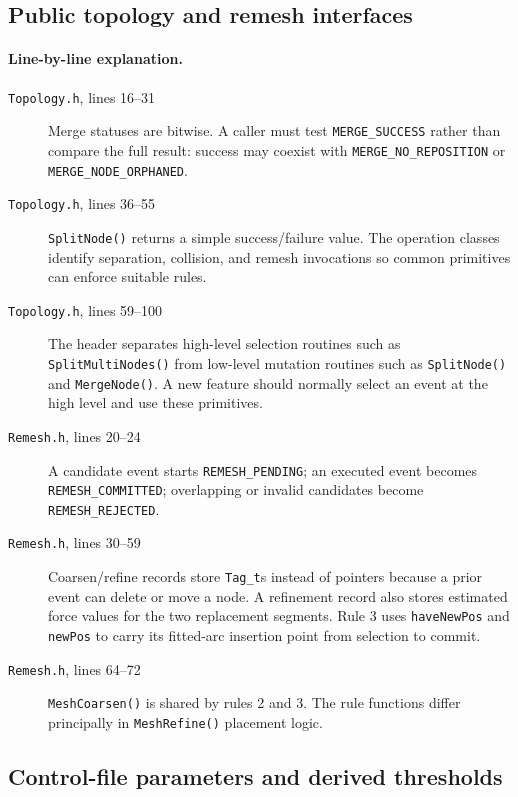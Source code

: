 \documentclass[11pt]{article}
\newcommand{\code}[1]{\texorpdfstring{\nolinkurl{#1}}{#1}}
\newcommand{\srcfile}[1]{\texorpdfstring{\nolinkurl{#1}}{#1}}
\begin{document}
\subsection{Public topology and remesh interfaces}





\paragraph{Line-by-line explanation.}
\begin{description}
\item[\srcfile{Topology.h}, lines 16--31] Merge statuses are bitwise. A caller
must test \code{MERGE_SUCCESS} rather than compare the full result: success
may coexist with \code{MERGE_NO_REPOSITION} or \code{MERGE_NODE_ORPHANED}.
\item[\srcfile{Topology.h}, lines 36--55] \code{SplitNode()} returns a simple
success/failure value. The operation classes identify separation, collision,
and remesh invocations so common primitives can enforce suitable rules.
\item[\srcfile{Topology.h}, lines 59--100] The header separates high-level
selection routines such as \code{SplitMultiNodes()} from low-level mutation
routines such as \code{SplitNode()} and \code{MergeNode()}. A new feature
should normally select an event at the high level and use these primitives.
\item[\srcfile{Remesh.h}, lines 20--24] A candidate event starts
\code{REMESH_PENDING}; an executed event becomes \code{REMESH_COMMITTED};
overlapping or invalid candidates become \code{REMESH_REJECTED}.
\item[\srcfile{Remesh.h}, lines 30--59] Coarsen/refine records store
\code{Tag_t}s instead of pointers because a prior event can delete or move a
node. A refinement record also stores estimated force values for the two
replacement segments. Rule 3 uses \code{haveNewPos} and \code{newPos} to
carry its fitted-arc insertion point from selection to commit.
\item[\srcfile{Remesh.h}, lines 64--72] \code{MeshCoarsen()} is shared by
rules 2 and 3. The rule functions differ principally in \code{MeshRefine()}
placement logic.
\end{description}

\subsection{Control-file parameters and derived thresholds}
\end{document}
